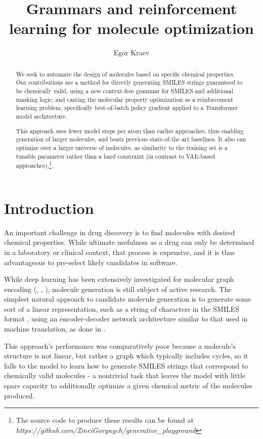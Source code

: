 \documentclass[11pt]{article}
\title{Grammars and reinforcement learning for molecule optimization}
\author{Egor Kraev}
\begin{document}
\maketitle

\begin{abstract}
We seek to automate the design of molecules based on specific chemical properties. Our contributions are a method for directly generating SMILES strings guaranteed to be chemically valid, using a new context-free grammar for SMILES and additional masking logic; and casting the molecular property optimization as a reinforcement learning problem, specifically best-of-batch policy gradient applied to a Transformer model architecture.

This approach uses fewer model steps per atom than earlier approaches, thus enabling generation of larger molecules, and beats previous state-of-the art baselines. It also can optimize over a larger universe of molecules, as similarity to the training set is a tunable parameter rather than a hard constraint (in contrast to VAE-based approaches).\footnote{The source code to produce these results can be found at \emph{https://github.com/ZmeiGorynych/generative\_playground} }.

\end{abstract}
\section{Introduction}
An important challenge in drug discovery is to find molecules with desired chemical properties. While ultimate usefulness as a drug can only be determined in a laboratory or clinical context, that process is expensive, and it is thus advantageous to pre-select likely candidates in software. 

While deep learning has been extensively investigated for molecular graph encoding (\cite{Duvenaud15}, \cite{Kearnes16}, \cite{Gilmer17}), molecule generation is still subject of active research. The simplest natural approach to candidate molecule generation is to generate some sort of a linear representation, such as a string of characters in the SMILES format \cite{Weininger88}, using an encoder-decoder network architecture similar to that used in machine translation, as done in \cite{Gomez-Bombarelli16}.

This approach's performance was comparatively poor because a molecule's structure is not linear, but rather a graph which typically includes cycles, so it falls to the model to learn how to generate SMILES strings that correspond to chemically valid molecules - a nontrivial task that leaves the model with little spare capacity to additionally optimize a given chemical metric of the molecules produced.
\end{document}
